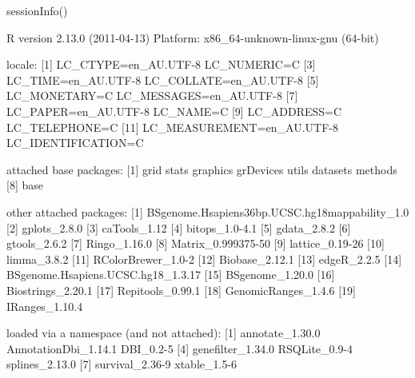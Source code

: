 \begin{Schunk}
\begin{Sinput}
 sessionInfo()
\end{Sinput}
\begin{Soutput}
R version 2.13.0 (2011-04-13)
Platform: x86_64-unknown-linux-gnu (64-bit)

locale:
 [1] LC_CTYPE=en_AU.UTF-8       LC_NUMERIC=C              
 [3] LC_TIME=en_AU.UTF-8        LC_COLLATE=en_AU.UTF-8    
 [5] LC_MONETARY=C              LC_MESSAGES=en_AU.UTF-8   
 [7] LC_PAPER=en_AU.UTF-8       LC_NAME=C                 
 [9] LC_ADDRESS=C               LC_TELEPHONE=C            
[11] LC_MEASUREMENT=en_AU.UTF-8 LC_IDENTIFICATION=C       

attached base packages:
[1] grid      stats     graphics  grDevices utils     datasets  methods  
[8] base     

other attached packages:
 [1] BSgenome.Hsapiens36bp.UCSC.hg18mappability_1.0
 [2] gplots_2.8.0                                  
 [3] caTools_1.12                                  
 [4] bitops_1.0-4.1                                
 [5] gdata_2.8.2                                   
 [6] gtools_2.6.2                                  
 [7] Ringo_1.16.0                                  
 [8] Matrix_0.999375-50                            
 [9] lattice_0.19-26                               
[10] limma_3.8.2                                   
[11] RColorBrewer_1.0-2                            
[12] Biobase_2.12.1                                
[13] edgeR_2.2.5                                   
[14] BSgenome.Hsapiens.UCSC.hg18_1.3.17            
[15] BSgenome_1.20.0                               
[16] Biostrings_2.20.1                             
[17] Repitools_0.99.1                              
[18] GenomicRanges_1.4.6                           
[19] IRanges_1.10.4                                

loaded via a namespace (and not attached):
[1] annotate_1.30.0      AnnotationDbi_1.14.1 DBI_0.2-5           
[4] genefilter_1.34.0    RSQLite_0.9-4        splines_2.13.0      
[7] survival_2.36-9      xtable_1.5-6        
\end{Soutput}
\end{Schunk}

